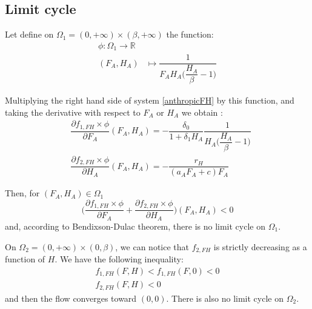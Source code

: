 \documentclass{article}
\begin{document}
\subsection{Limit cycle}

Let define on $\Omega_1 = (0, +\infty)\times (\beta, +\infty)$ the function:
\begin{align}
\phi : \Omega_1 \longrightarrow \mathbb{R} \label{limit cylce:phiFH}
\\
\nonumber
(F_A,H_A) & \mapsto \dfrac{1}{F_A H_A \Big(\dfrac{H_A}{\beta} - 1\Big)}
\end{align}

Multiplying the right hand side of system \eqref{anthropicFH} by this function, and taking the derivative with respect to $F_A$ or $H_A$ we obtain :
\begin{subequations}
\begin{align}
&\dfrac{\partial f_{1,FH} \times \phi}{\partial F_A}(F_A,H_A) = - \dfrac{\delta_0}{1 + \delta_1 H_A} \dfrac{1}{H_A \big(\dfrac{H_A}{\beta}-1 \big)} \\
&\dfrac{\partial f_{2,FH} \times \phi}{\partial H_A}(F_A,H_A) = - \dfrac{r_H}{(a_AF_A + c) F_A}
\end{align}
\end{subequations}

Then, for $(F_A, H_A) \in \Omega_1$
\begin{equation}
\Big(\dfrac{\partial f_{1,FH} \times \phi}{\partial F_A} + \dfrac{\partial f_{2,FH} \times \phi}{\partial H_A}\Big) (F_A, H_A) < 0
\end{equation}
and, according to Bendixson-Dulac theorem, there is no limit cycle on $\Omega_1$.

On $\Omega_2 = (0, +\infty)\times (0, \beta)$, we can notice that $f_{2, FH}$ is strictly decreasing as a function of $H$. We have the following inequality:
\begin{align*}
f_{1,FH}(F,H) < f_{1,FH}(F,0) < 0\\
f_{2,FH}(F,H) < 0
\end{align*}
and then the flow converges toward $(0,0)$. There is also no limit cycle on $\Omega_2$.

\newpage
\end{document}
